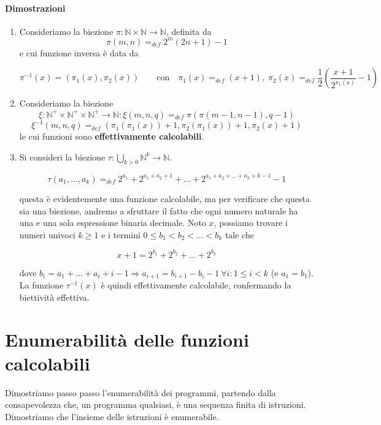 	\paragraph{Dimostrazioni}
	\begin{enumerate}
		\item Consideriamo la biezione $\pi : \mathbb{N}\times\mathbb{N} \to \mathbb{N}$, definita da 
		$$
		\pi (m,n) =_{def} 2^m (2n + 1) -1
		$$
		e cui funzione inversa è data da
		
		$$
		\pi^{-1}(x) = (\pi_1(x), \pi_2(x)) \qquad \text{con} \quad \pi_1(x) =_{def}(x+1), \; \pi_2(x) =_{def}\dfrac{1}{2}\left(\dfrac{x+1}{2^{\pi_1(x)}} - 1\right)
		$$
		
		\item Consideriamo la biezione 
		$$
		\xi : \mathbb{N}^+\times\mathbb{N}^+\times\mathbb{N}^+ \to \mathbb{N} : 
		\xi(m,n,q) =_{def} \pi(\pi(m-1,n-1), q-1)
		$$
		$$
		\xi^{-1}(m,n,q) =_{def} (\pi_1(\pi_1(x)) + 1, \pi_2(\pi_1(x)) + 1, \pi_2(x) + 1)
		$$
		le cui funzioni sono \textbf{effettivamente calcolabili}.
		
		\item Si consideri la biezione $\tau : \bigcup_{k > 0} \mathbb{N}^k \to \mathbb{N}$.
		
		$$
		\tau(a_1, \dots, a_k) =_{def} 2^{a_1} + 2^{a_1 + a_2 + 1} + \dots + 2^{a_1 + a_2 + \dots + a_k + k - 1}-1
		$$
		
		questa è evidentemente una funzione calcolabile, ma per verificare che questa sia una biezione, andremo a sfruttare il fatto che ogni numero naturale ha una e una sola espressione binaria decimale. Noto $x$, possiamo trovare i numeri univoci $k \geq 1$ e i termini  $0 \leq b_1  < b_2 < \dots < b_k$ tale che
		
		$$
		x+1 = 2^{b_1} + 2^{b_2}+ \dots + 2^{b_k}
		$$
		
		dove $b_i = a_1 + \dots + a_i + i -1 \Rightarrow a_{i + 1} = b_{i+1} - b_i -1 \ \forall i: 1\leq i < k$ (e $a_1 = b_1$). La funzione $\tau^{-1}(x)$ è quindi effettivamente calcolabile, confermando la biettività effettiva.
		
	\end{enumerate}
	
	\section{Enumerabilità delle funzioni calcolabili}
	
	Dimostriamo passo passo l'enumerabilità dei programmi, partendo dalla consapevolezza che, un programma qualsiasi, è una sequenza finita di istruzioni. Dimostriamo che l'insieme delle istruzioni è enumerabile.
	
